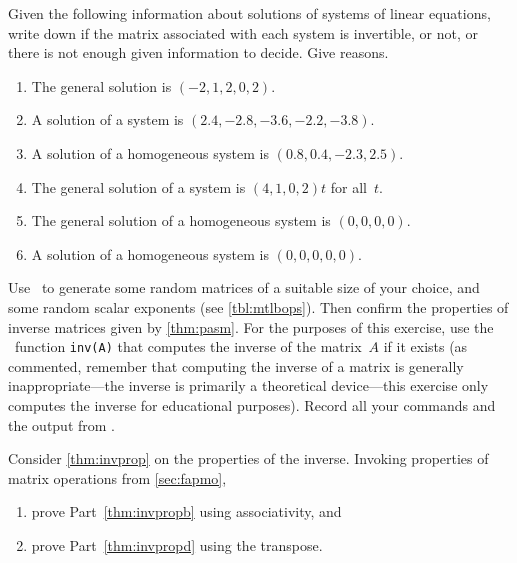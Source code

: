 \begin{exercise} \label{ex:} 
Given the following information about solutions of systems of linear equations, write down if the matrix associated with each system is invertible, or not, or there is not enough given information to decide.  
Give reasons.
\begin{enumerate}
\item The general solution is \((-2,1,2,0,2)\).

\item A solution of a system is \((2.4,-2.8,-3.6,-2.2,-3.8)\).

\item A solution of a homogeneous system is \((0.8,0.4,-2.3,2.5)\).

\item The general solution of a system is \((4,1,0,2)t\) for all~\(t\).

\item The general solution of a homogeneous system is \((0,0,0,0)\).

\item A solution of a homogeneous system is \((0,0,0,0,0)\).

\end{enumerate}
\end{exercise}





\begin{exercise} \label{ex:} 
Use \script\ to generate some random matrices of a suitable size of your choice, and some random scalar exponents (see \autoref{tbl:mtlbops}).
Then confirm the properties of inverse matrices given by \autoref{thm:pasm}.
For the purposes of this exercise, use the \script\ function \verb|inv(A)| that computes the inverse of the matrix~\(A\) if it exists (as commented, remember that computing the inverse of a matrix is generally inappropriate---the inverse is primarily a  theoretical device---this exercise only computes the inverse for educational purposes).
Record all your commands and the output from \script.
\end{exercise}







\begin{exercise} \label{ex:} 
Consider \autoref{thm:invprop} on the properties of the inverse. Invoking properties of matrix operations from \autoref{sec:fapmo},
\begin{enumerate}
\item prove Part~\ref{thm:invpropb} using associativity, and
\item prove Part~\ref{thm:invpropd} using the transpose.
\end{enumerate}
\end{exercise}



